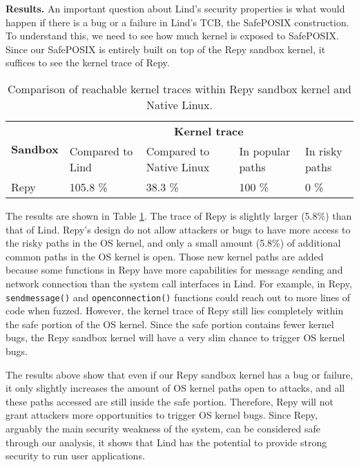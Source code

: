 {{\noindent
\textbf{Results.}
An important question about Lind's security properties is what would happen if there is a bug or a failure in Lind's TCB,
the SafePOSIX construction. To understand this, we need to see how much kernel is exposed to 
SafePOSIX. Since our SafePOSIX is entirely built on top of the Repy sandbox kernel, it suffices to see the kernel 
trace of Repy.  

\begin{table}
\centering
\scriptsize
\begin{tabular}{|l|l|l|l|l|}
  \hline
  \multirow{3}{.8cm}{\bf Sandbox} & \multicolumn{4}{c|}{\bf Kernel trace} \\ \cline{2-5}
  & \multirow{2}{1cm}{Compared to Lind} &
  \multirow{2}{1.3cm}{Compared to Native Linux} & \multirow{2}{1.5cm}{In popular paths} &
  \multirow{2}{1.0cm}{In risky paths} \\
  & & & & \\  \hline

  Repy & 105.8 \% & 38.3 \% & 100 \%  & 0 \%  \\
  \hline
\end{tabular}
\caption{\small Comparison of reachable kernel traces within Repy sandbox kernel and Native Linux.}
\label{table:trace-Repy}
\end{table}

The results are shown in Table \ref{table:trace-Repy}. 
The trace of Repy is slightly larger (5.8\%) than that of Lind.
Repy's design do not allow attackers or bugs to
have more access to the risky paths in the OS kernel, and only a small amount (5.8\%) of
additional common paths in the OS kernel is open.
Those new kernel paths are added because some functions in Repy
have more capabilities for message sending and network connection than the system call interfaces
in Lind. For example, in Repy,
\texttt{sendmessage()} and \texttt{openconnection()}
functions could reach out to more lines of code when fuzzed. However, the kernel
 trace of Repy still lies completely within the safe
portion of the OS kernel.
Since the safe portion contains fewer kernel bugs, the Repy sandbox kernel
will have a very slim chance to trigger OS kernel bugs.

The results above show that even if our Repy sandbox kernel has a
bug or failure,
it only slightly increases the amount of OS kernel paths open to attacks,
and all these paths accessed are still inside the safe portion.
Therefore, Repy will not grant attackers more opportunities to trigger OS
kernel bugs.
Since Repy, arguably the main security weakness of the system, can be
considered safe through our analysis,
it shows that Lind has the potential to provide strong security to run user applications.

}}
